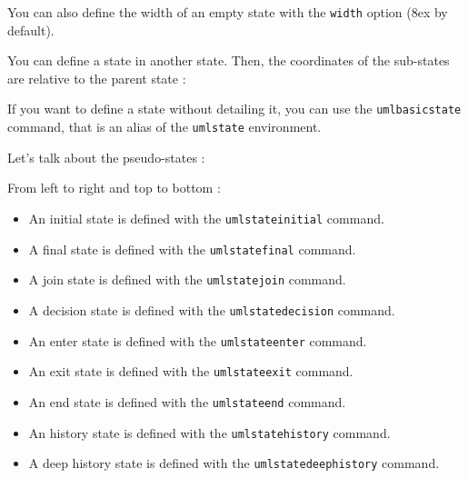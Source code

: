 \documentclass[a4paper,11pt]{report}
\newcommand{\inputTikZ}[1]{%
  }%
\newcommand{\inputTikZ}[1]{%
    \texttt{[image: fig/\#1.pdf]}%
  }%
\begin{document}
\medskip

You can also define the width of an empty state with the  {\tt width} option (8ex by default).

\medskip

You can define a state in another state. Then, the coordinates of the sub-states are relative to the parent state :

\medskip

\begin{minipage}{0.51\textwidth}

\end{minipage}
\begin{minipage}{0.49\textwidth}
\begin{center}
\inputTikZ{stateinner}
\end{center}
\end{minipage}

\medskip

If you want to define a state without detailing it, you can use the {\tt umlbasicstate} command, that is an alias of the {\tt umlstate} environment.

\medskip

Let's talk about the pseudo-states :

\medskip

\begin{minipage}{0.51\textwidth}

\end{minipage}
\begin{minipage}{0.49\textwidth}
\begin{center}
\inputTikZ{statespecial}
\end{center}
\end{minipage}

\medskip

From left to right and top to bottom :

\medskip

\begin{itemize}
\item An initial state is defined with the {\tt umlstateinitial} command.
\item A final state is defined with the {\tt umlstatefinal} command.
\item A join state is defined with the {\tt umlstatejoin} command.
\item A decision state is defined with the {\tt umlstatedecision} command.
\item An enter state is defined with the {\tt umlstateenter} command.
\item An exit state is defined with the {\tt umlstateexit} command.
\item An end state is defined with the {\tt umlstateend} command.
\item An history state is defined with the {\tt umlstatehistory} command.
\item A deep history state is defined with the {\tt umlstatedeephistory} command.
\end{itemize}
\end{document}
